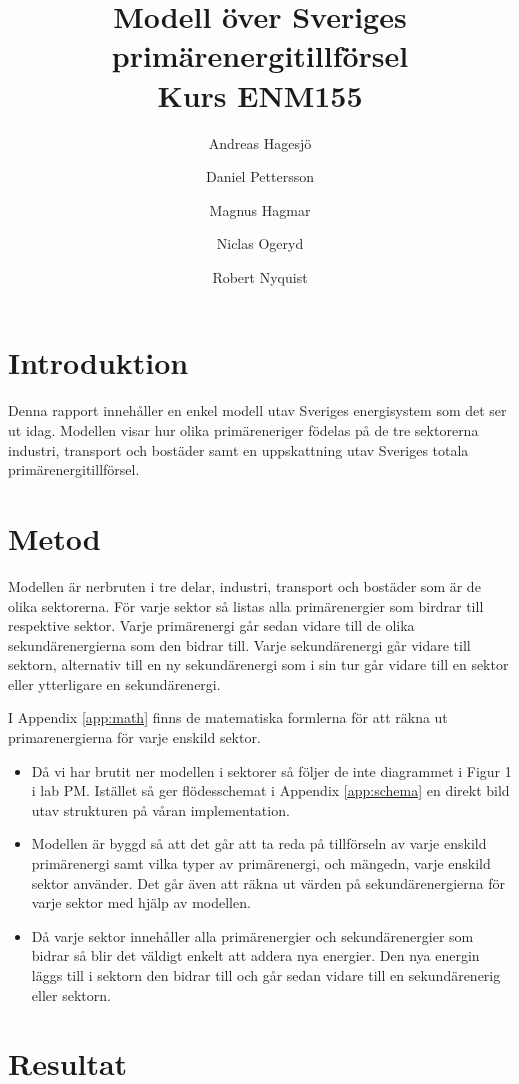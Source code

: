 \documentclass[a4paper,11pt,fleqn, titlepage]{article}
\author{Andreas Hagesjö \and Daniel Pettersson \and
Magnus Hagmar \and Niclas Ogeryd \and Robert Nyquist}
\title{Modell över Sveriges primärenergitillförsel \\ Kurs ENM155}
\begin{document}
\maketitle

\section{Introduktion}
Denna rapport innehåller en enkel modell utav Sveriges energisystem som det
ser ut idag. Modellen visar hur olika primäreneriger födelas på de tre
sektorerna industri, transport och bostäder samt en uppskattning utav
Sveriges totala primärenergitillförsel.


\section{Metod}
Modellen är nerbruten i tre delar, industri, transport och bostäder som är
de olika sektorerna. För varje sektor så listas alla primärenergier som
birdrar till respektive sektor. Varje primärenergi går sedan vidare till de
olika sekundärenergierna som den bidrar till. Varje sekundärenergi går
vidare till sektorn, alternativ till en ny sekundärenergi som i sin tur går
vidare till en sektor eller ytterligare en sekundärenergi.

I Appendix \ref{app:math} finns de matematiska formlerna för att räkna ut
primarenergierna för varje enskild sektor.


\begin{itemize}
\item Då vi har brutit ner modellen i sektorer så följer de inte diagrammet
	i Figur 1 i lab PM. Istället så ger flödesschemat i Appendix
	\ref{app:schema} en direkt bild utav strukturen på våran
	implementation.


\item Modellen är byggd så att det går att ta reda på tillförseln av varje
	enskild primärenergi samt vilka typer av primärenergi, och mängedn,
	varje enskild sektor använder. Det går även att räkna ut värden på
	sekundärenergierna för varje sektor med hjälp av modellen.

\item Då varje sektor innehåller alla primärenergier och sekundärenergier
	som bidrar så blir det väldigt enkelt att addera nya energier. Den nya
	energin läggs till i sektorn den bidrar till och går sedan vidare till
	en sekundärenerig eller sektorn.
\end{itemize}

\section{Resultat}
\end{document}
